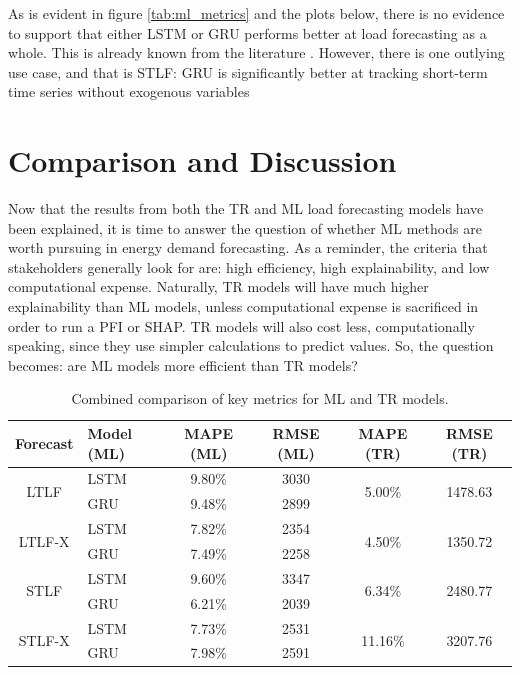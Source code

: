 \documentclass[12pt]{scrreprt}
\begin{document}
\newpage

As is evident in figure \ref{tab:ml_metrics} and the plots below, there is no evidence to support that either LSTM or GRU performs better at load forecasting as a whole. This is already known from the literature \cite{Chung14}. However, there is one outlying use case, and that is STLF: GRU is significantly better at tracking short-term time series without exogenous variables

\chapter{Comparison and Discussion}

Now that the results from both the TR and ML load forecasting models have been explained, it is time to answer the question of whether ML methods are worth pursuing in energy demand forecasting. As a reminder, the criteria that stakeholders generally look for are: high efficiency, high explainability, and low computational expense. Naturally, TR models will have much higher explainability than ML models, unless computational expense is sacrificed in order to run a PFI or SHAP. TR models will also cost less, computationally speaking, since they use simpler calculations to predict values. So, the question becomes: are ML models more efficient than TR models?

\begin{table}[h]
    \centering
    \begin{tabular}{|c | l c c | c c|}
        \hline
        Forecast & Model (ML) & MAPE (ML) & RMSE (ML) & MAPE (TR) & RMSE (TR)\\
        \hline
        \multirow{2}{*}{LTLF} & LSTM & 9.80\% & 3030 & \multirow{2}{*}{5.00\%} & \multirow{2}{*}{1478.63} \\
                              & GRU  & 9.48\% & 2899 & & \\
        \hline
        \multirow{2}{*}{LTLF-X} & LSTM & 7.82\% & 2354 & \multirow{2}{*}{4.50\%} & \multirow{2}{*}{1350.72} \\
                                & GRU  & 7.49\% & 2258 & & \\
        \hline
        \multirow{2}{*}{STLF} & LSTM & 9.60\% & 3347 & \multirow{2}{*}{6.34\%} & \multirow{2}{*}{2480.77} \\
                              & GRU  & 6.21\% & 2039 & & \\
        \hline
        \multirow{2}{*}{STLF-X} & LSTM & 7.73\% & 2531 & \multirow{2}{*}{11.16\%} & \multirow{2}{*}{3207.76} \\
                                & GRU  & 7.98\% & 2591 & & \\
        \hline
    \end{tabular}
    \caption{Combined comparison of key metrics for ML and TR models.}
    \label{tab:all_metrics}
\end{table}
\end{document}
